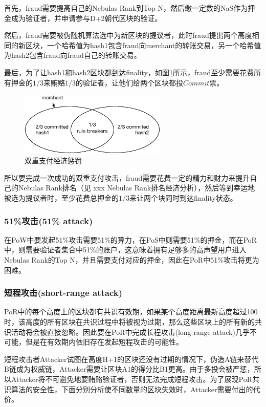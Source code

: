 首先，fraud需要提高自己的Nebulas Rank到Top N，然后缴一定数的NaS作为押金成为验证者，并申请参与D+2朝代区块的验证。

然后，fraud需要被伪随机算法选中为新区块的提议者，此时fraud提出两个高度相同的新区块，一个哈希值为hash1包含fraud向merchant的转账交易，另一个哈希值为hash2包含fraud向fraud自己的转账交易。

最后，为了让hash1和hash2区块都到达finality，如图\ref{fig:double_spend}所示，fraud至少需要花费所有押金的$1/3$来贿赂$1/3$的验证者，让他们给两个区块都投$Commit$票。

\begin{figure}[h]
\centering
\includegraphics[width=7cm]{./figs/overlap}
\caption{双重支付经济惩罚}
\label{fig:double_spend}
\end{figure}

所以要完成一次成功的双重支付攻击，fraud需要花费一定的精力和财力来提升自己的Nebulas Rank排名（见 xxx Nebulas Rank排名经济分析），然后等到幸运地被选为提议者时，至少花费总押金的$1/3$来让两个块同时到达finality状态。

\subsubsection*{51\%攻击(51\% attack)}
\label{por:economic:fraud:51attack}

在PoW中要发起51\%攻击需要51\%的算力，在PoS中则需要51\%的押金，而在PoR中，则需要验证者集合中51\%的账户，这意味着拥有足够多的高声望用户进入Nebulas Rank的Top N，并且需要支付对应的押金，因此在PoR中51\%攻击将更为困难。

\subsubsection*{短程攻击(short-range attack)}
\label{por:economic:fraud:short_range_attack}

PoR中的每个高度上的区块都有共识有效期，如果某个高度距离最新高度超过100时，该高度的所有区块在共识过程中将被视为过期，那么这些区块上的所有新的共识活动将会被直接忽略。因此要在PoR中完成长程攻击(long-range attack)几乎不可能，但是在有效期内依旧存在发起短程攻击的可能性。

短程攻击者Attacker试图在高度H+1的区块还没有过期的情况下，伪造A链来替代B链成为权威链，Attacker需要让区块A1的得分比B1更高。由于多投会被严惩，所以Attacker将不可避免地要贿赂验证者，否则无法完成短程攻击。为了展现PoR共识算法的安全性，下面分别分析使不同数量的区块失效时，Attacker需要付出的代价。

